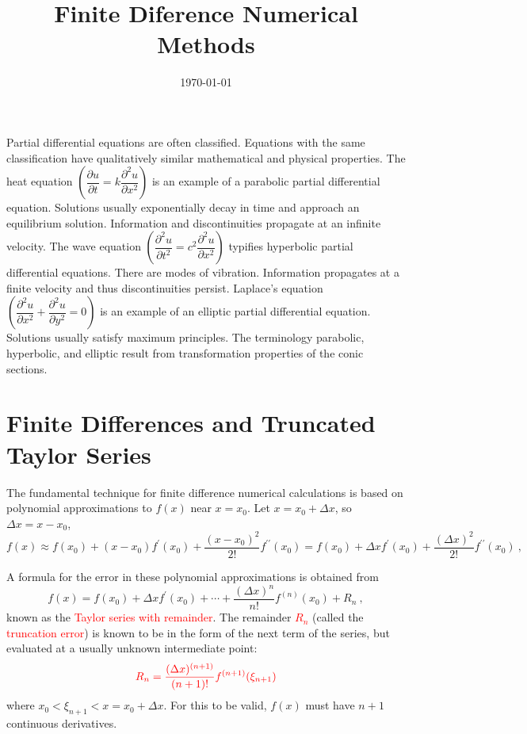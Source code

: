 \documentclass[12pt,a4paper]{article}
\title{Finite Diference Numerical Methods}
\author{}
\date{\today}
\begin{document}
\maketitle
Partial differential equations are often classified. Equations with the same classification have qualitatively similar mathematical and physical properties. The heat equation $\left(\dfrac{\partial u}{\partial t} = k\dfrac{\partial^2 u}{\partial x^2} \right)$ is an example  of a parabolic partial differential equation. Solutions usually exponentially decay in time and approach an equilibrium solution. Information and discontinuities propagate at an infinite velocity. The wave equation $\left(\dfrac{\partial^2 u}{\partial t^2} = c^2 \dfrac{\partial^2 u}{\partial x^2} \right)$ typifies hyperbolic partial differential equations. There are modes of vibration. Information propagates at a finite velocity and thus discontinuities persist. Laplace's equation $\left(\dfrac{\partial^2 u}{\partial x^2} + \dfrac{\partial^2 u}{\partial y^2} = 0 \right)$ is an example of an elliptic partial differential equation. Solutions usually satisfy maximum principles. The terminology parabolic, hyperbolic, and elliptic result from transformation properties of the conic sections.


\section{Finite Differences and Truncated Taylor Series}
The fundamental technique for finite difference numerical calculations is based on polynomial approximations to $f(x)$ near $x=x_0$. Let $x = x_0 +\Delta x$, so $\Delta x = x - x_0$,
\begin{equation}
f(x) \approx f(x_0) +(x-x_0) f^\prime(x_0) +\frac{(x-x_0)^2}{2!} f^{\prime\prime}(x_0) = f(x_0) +\Delta x f^\prime(x_0) +\frac{(\Delta x)^2}{2!} f^{\prime\prime}(x_0) ~,
\end{equation}

A formula for the error in these polynomial approximations is obtained from
\begin{equation}
f(x) = f(x_0) +\Delta x f^\prime(x_0) +\cdots +\frac{(\Delta x)^n}{n!} f^{(n)}(x_0) +R_n ~,
\end{equation}
known as the \textcolor{red}{Taylor series with remainder}. The remainder \textcolor{red}{$R_n$} (called the \textcolor{red}{truncation error}) is known to be in the form of the next term of the series, but evaluated at a usually unknown intermediate point:
\begin{equation}
\color{red} R_n = \frac{(\Delta x)^{(n+1)} }{(n+1)!} f^{(n+1)}(\xi_{n+1})
\end{equation}
where $x_0 < \xi_{n+1} < x = x_0 +\Delta x$. For this to be valid, $f(x)$ must have $n+1$ continuous derivatives.
\end{document}
